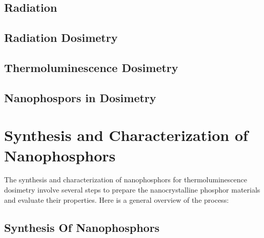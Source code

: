 \documentclass{article}[10pt]
\begin{document}
    \subsection{\large Radiation}

      
    
    \subsection{\large Radiation Dosimetry}
      

    \subsection{\large Thermoluminescence Dosimetry}
      

    \subsection{\large Nanophospors in Dosimetry}
      

  \newpage
  \section{Synthesis and Characterization of Nanophosphors}
    The synthesis and characterization of nanophosphors for thermoluminescence dosimetry involve several steps to 
    prepare the nanocrystalline phosphor materials and evaluate their properties. Here is a general overview of 
    the process:

    \subsection{\large Synthesis Of Nanophosphors}
      

  \newpage
  
  
\end{document}
